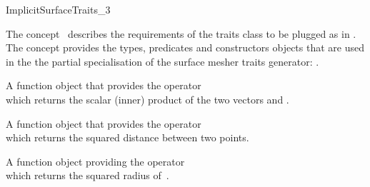 

\begin{ccRefConcept}{ImplicitSurfaceTraits_3}

\ccDefinition
  
The concept \ccRefName\  describes the requirements of the traits class to
be plugged  as  in .
The concept provides the types, predicates and constructors objects
that are  used in the 
the partial specialisation  of 
the  surface mesher traits generator:
.




\ccTypes

\ccGlue
{}
\ccGlue
{}
\ccGlue
{}
\ccGlue
{}
\ccGlue
{}
\ccGlue
{}


{A function object that provides the operator\\
 which returns the scalar
(inner) product of the two vectors  and .}

{A function object that provides the operator\\
 which returns the squared distance
between two points.}

{A function object providing the operator\\
 which returns the squared radius
of~.}


\end{ccRefConcept}
